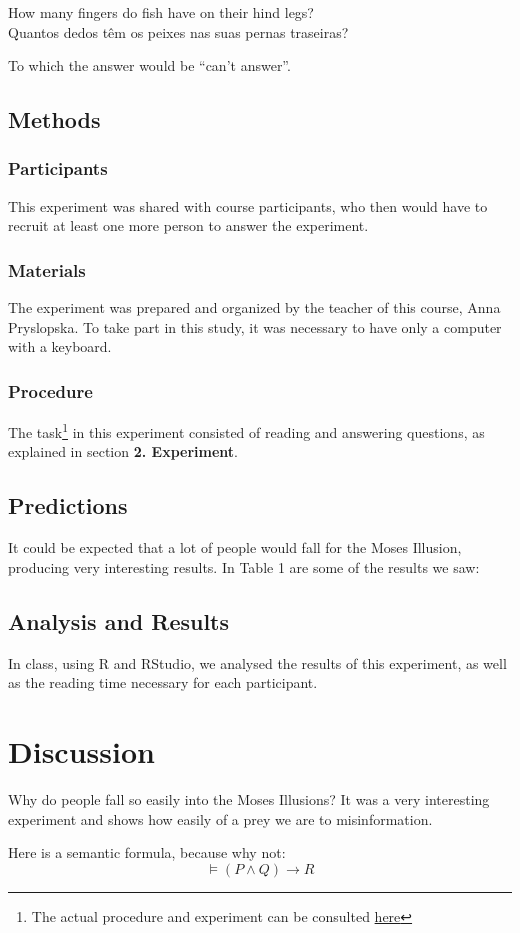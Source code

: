 \documentclass{article}
\begin{document}
\begin{exe}
\ex \begin{xlist}
\ex \gll How many fingers do fish have on their hind legs?\\
Quantos dedos têm os peixes nas suas pernas traseiras?\\
\end{xlist}
\end{exe}

To which the answer would be \enquote{can't answer}.

\subsection{Methods}
\subsubsection{Participants}
This experiment was shared with course participants, who then would have to recruit at least one more person to answer the experiment.
\subsubsection{Materials}
The experiment was prepared and organized by the teacher of this course, Anna Pryslopska. To take part in this study, it was necessary to have only a computer with a keyboard.

\subsubsection{Procedure}
The task\footnote{The actual procedure and experiment can be consulted \href{https://farm.pcibex.net/p/glQRwV/}{here}} in this experiment consisted of reading and answering questions, as explained in section \textbf{2. Experiment}.
\subsection{Predictions}
It could be expected that a lot of people would fall for the Moses Illusion, producing very interesting results.
In Table 1 are some of the results we saw:

\subsection{Analysis and Results}
In class, using R and RStudio, we analysed the results of this experiment, as well as the reading time necessary for each participant.
\section{Discussion}
Why do people fall so easily into the Moses Illusions? It was a very interesting experiment and shows how easily of a prey we are to misinformation.

Here is a semantic formula, because why not:
\[
\models (P \land Q) \rightarrow R
\]
\end{document}
